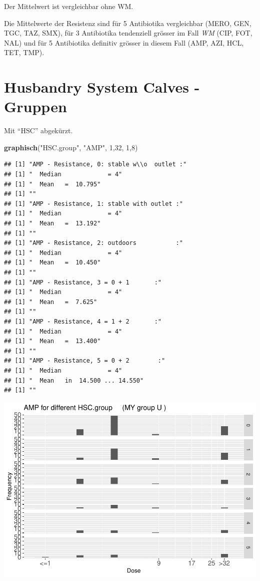 \documentclass[
]{article}
\newenvironment{Shaded}{\begin{snugshade}}{\end{snugshade}}
\newcommand{\DecValTok}[1]{\textcolor[rgb]{0.00,0.00,0.81}{#1}}
\newcommand{\KeywordTok}[1]{\textcolor[rgb]{0.13,0.29,0.53}{\textbf{#1}}}
\newcommand{\NormalTok}[1]{#1}
\newcommand{\StringTok}[1]{\textcolor[rgb]{0.31,0.60,0.02}{#1}}
\begin{document}
Der Mittelwert ist vergleichbar ohne WM.

Die Mittelwerte der Resistenz sind für 5 Antibiotika vergleichbar (MERO,
GEN, TGC, TAZ, SMX), für 3 Antibiotika tendenziell grösser im Fall
\emph{WM} (CIP, FOT, NAL) und für 5 Antibiotika definitiv grösser in
diesem Fall (AMP, AZI, HCL, TET, TMP).

\hypertarget{husbandry-system-calves---gruppen}{%
\section{Husbandry System Calves -
Gruppen}\label{husbandry-system-calves---gruppen}}

Mit ``HSC'' abgekürzt.

\begin{Shaded}
\begin{Highlighting}[]
  \KeywordTok{graphisch}\NormalTok{(}\StringTok{"HSC.group"}\NormalTok{, }\StringTok{"AMP"}\NormalTok{, }\DecValTok{1}\NormalTok{,}\DecValTok{32}\NormalTok{, }\DecValTok{1}\NormalTok{,}\DecValTok{8}\NormalTok{)}
\end{Highlighting}
\end{Shaded}

\begin{verbatim}
## [1] "AMP - Resistance, 0: stable w\\o  outlet :"
## [1] "  Median             = 4"
## [1] "  Mean   =  10.795"
## [1] ""
## [1] "AMP - Resistance, 1: stable with outlet :"
## [1] "  Median             = 4"
## [1] "  Mean   =  13.192"
## [1] ""
## [1] "AMP - Resistance, 2: outdoors           :"
## [1] "  Median             = 4"
## [1] "  Mean   =  10.450"
## [1] ""
## [1] "AMP - Resistance, 3 = 0 + 1       :"
## [1] "  Median             = 4"
## [1] "  Mean   =  7.625"
## [1] ""
## [1] "AMP - Resistance, 4 = 1 + 2       :"
## [1] "  Median             = 4"
## [1] "  Mean   =  13.400"
## [1] ""
## [1] "AMP - Resistance, 5 = 0 + 2        :"
## [1] "  Median             = 4"
## [1] "  Mean   in  14.500 ... 14.550"
## [1] ""
\end{verbatim}

\includegraphics{Verteilungen_files/figure-latex/unnamed-chunk-44-1.pdf}
\end{document}
